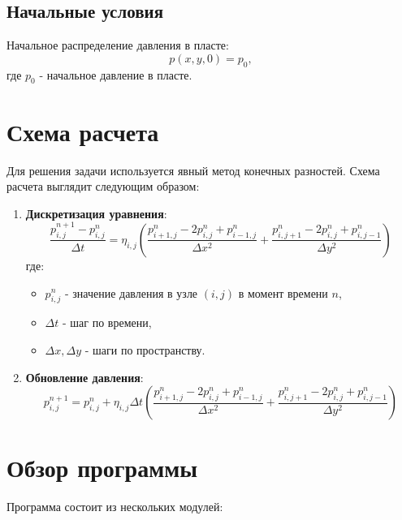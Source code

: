 \documentclass{article}
\begin{document}
\subsection{Начальные условия}

Начальное распределение давления в пласте:
\[
p(x, y, 0) = p_0,
\]
где \( p_0 \) - начальное давление в пласте.

\section{Схема расчета}

Для решения задачи используется явный метод конечных разностей. Схема расчета выглядит следующим образом:

\begin{enumerate}
    \item \textbf{Дискретизация уравнения}:
    \[
    \frac{p_{i,j}^{n+1} - p_{i,j}^n}{\Delta t} = \eta_{i,j} \left( \frac{p_{i+1,j}^n - 2p_{i,j}^n + p_{i-1,j}^n}{\Delta x^2} + \frac{p_{i,j+1}^n - 2p_{i,j}^n + p_{i,j-1}^n}{\Delta y^2} \right)
    \]
    где:
    \begin{itemize}
        \item \( p_{i,j}^n \) - значение давления в узле \( (i, j) \) в момент времени \( n \),
        \item \( \Delta t \) - шаг по времени,
        \item \( \Delta x, \Delta y \) - шаги по пространству.
    \end{itemize}

    \item \textbf{Обновление давления}:
    \[
    p_{i,j}^{n+1} = p_{i,j}^n + \eta_{i,j} \Delta t \left( \frac{p_{i+1,j}^n - 2p_{i,j}^n + p_{i-1,j}^n}{\Delta x^2} + \frac{p_{i,j+1}^n - 2p_{i,j}^n + p_{i,j-1}^n}{\Delta y^2} \right)
    \]
\end{enumerate}

\section{Обзор программы}

Программа состоит из нескольких модулей:
\end{document}
